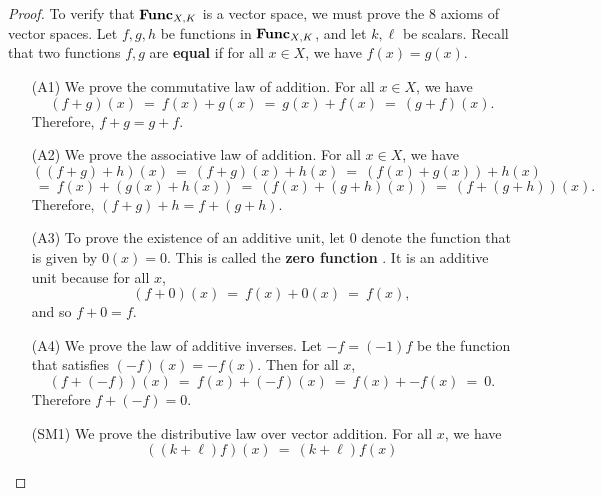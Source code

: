 \begin{proof}
  To verify that $\mathbf{Func}_{X,K}$ is a vector space, we must prove the 8
  axioms of vector spaces. Let $f, g, h$ be functions in $\mathbf{Func}_{X,K}$,
  and let $k,\ell$ be scalars. Recall that two functions $f,g$
  are \textbf{equal}%
   if for all $x\in X$, we have
  $f(x)=g(x)$.

  \begin{itemize}
  \item[(A1)] We prove the commutative law of addition. For all
    $x\in X$, we have
    \begin{equation*}
      (f + g) (x)
      ~=~ f(x) + g(x)
      ~=~ g(x) + f(x)
      ~=~ (g + f) (x).
    \end{equation*}
    Therefore, $f + g = g + f$.
  \item[(A2)] We prove the associative law of addition. For all
    $x\in X$, we have
    \begin{equation*}
      ((f + g) + h) (x)
      ~=~ (f + g) (x) + h(x)
      ~=~ (f(x) + g(x)) + h(x)
    \end{equation*}
    \begin{equation*}
      ~=~ f(x) + (g(x) + h(x))
      ~=~ (f(x) + (g + h) (x))
      ~=~ (f + (g + h)) (x).
    \end{equation*}
    Therefore, $(f + g) + h = f + (g + h)$.
  \item[(A3)] To prove the existence of an additive unit, let $0$
    denote the function that is given by $0(x)=0$. This is called the
    \textbf{zero function}%
    . It is an additive unit because for all $x$,
    \begin{equation*}
      (f + 0) (x)
      ~=~ f(x) + 0(x)
      ~=~ f(x),
    \end{equation*}
    and so $f+0 = f$.
  \item[(A4)] We prove the law of additive inverses. Let $-f = (-1)f$
    be the function that satisfies $(-f) (x) = -f(x)$. Then for all $x$,
    \begin{equation*}
      (f + (-f)) (x)
      ~=~ f(x) + (-f) (x)
      ~=~ f(x) + -f(x)
      ~=~ 0.
    \end{equation*}
    Therefore $f + (-f) = 0$.
  \item[(SM1)] We prove the distributive law over vector addition. For
    all $x$, we have
    \begin{equation*}
      ((k + \ell ) f) (x)
      ~=~ (k + \ell ) f(x)

\end{equation*}
\end{itemize}
\end{proof}
